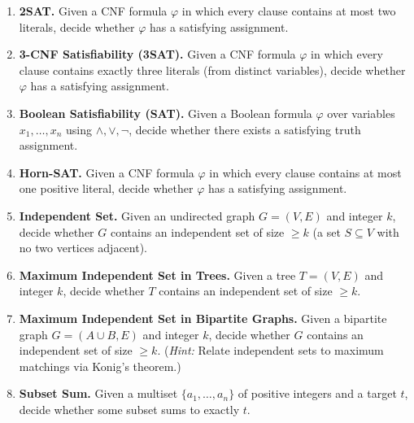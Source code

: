 \documentclass[9pt]{book}
\begin{document}
\begin{enumerate}[label=\arabic*.]

\item \textbf{2SAT.}
Given a CNF formula $\varphi$ in which every clause contains at most two literals, 
decide whether $\varphi$ has a satisfying assignment.

\bigskip

\item \textbf{3-CNF Satisfiability (3SAT).}
Given a CNF formula $\varphi$ in which every clause contains exactly three 
literals (from distinct variables), decide whether $\varphi$ has a satisfying 
assignment.

\bigskip

\item \textbf{Boolean Satisfiability (SAT).}
Given a Boolean formula $\varphi$ over variables $x_1,\ldots,x_n$ using 
$\land,\lor,\lnot$, decide whether there exists a satisfying truth assignment.

\bigskip

\item \textbf{Horn-SAT.}
Given a CNF formula $\varphi$ in which every clause contains at most one 
positive literal, decide whether $\varphi$ has a satisfying assignment.

\bigskip

\item \textbf{Independent Set.}
Given an undirected graph $G=(V,E)$ and integer $k$, 
decide whether $G$ contains an independent set of size 
$\geq k$ (a set $S\subseteq V$ with no two vertices adjacent).

\bigskip

\item \textbf{Maximum Independent Set in Trees.}
Given a tree $T=(V,E)$ and integer $k$, decide whether $T$ contains an 
independent set of size $\geq k$.

\bigskip

\item \textbf{Maximum Independent Set in Bipartite Graphs.}
Given a bipartite graph $G=(A\cup B,E)$ and integer $k$, decide whether $G$ contains 
an independent set of size $\geq k$.
(\textit{Hint:} Relate independent sets to maximum matchings via Konig's theorem.)

\bigskip

\item \textbf{Subset Sum.}
Given a multiset $\{a_1,\ldots,a_n\}$ of positive integers and a target $t$, 
decide whether some subset sums to exactly $t$.


\end{enumerate}
\end{document}

